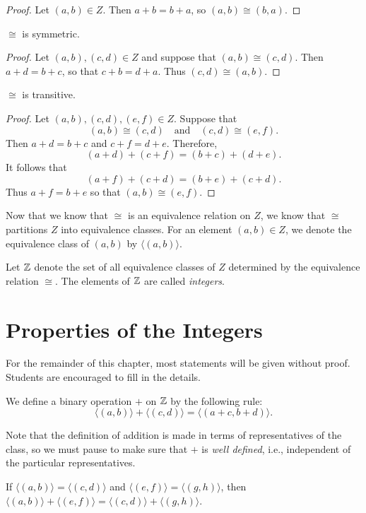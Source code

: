 \begin{proof}
Let $(a,b)\in Z$.  Then $a+b=b+a$, so $(a,b)\cong(b,a)$.
\end{proof}

\begin{lemma}
$\cong$ is symmetric.
\end{lemma}

\begin{proof} Let $(a,b),(c,d)\in Z$ and suppose
that $(a,b)\cong (c,d)$.  Then $a+d=b+c$, so that
$c+b=d+a$.  Thus $(c,d)\cong (a,b)$.
\end{proof}

\begin{lemma}
$\cong$ is transitive.
\end{lemma}

\begin{proof}
Let $(a,b), (c,d), (e,f)\in Z$.  Suppose that
\[
(a,b)\cong(c,d)\quad\text{and}\quad (c,d)\cong (e,f).
\]
Then $a+d=b+c$ and $c+f=d+e$.  Therefore,
\[
(a+d)+(c+f) =(b+c)+(d+e).
\]
It follows that
\[
(a+f)+(c+d) =(b+e)+(c+d).
\]
Thus $a+f = b+e$ so that $(a,b)\cong(e,f)$.
\end{proof}

Now that we know that $\cong$ is an equivalence relation on
$Z$, we know that $\cong$ partitions $Z$ into equivalence classes.
For an element $(a,b)\in Z$, we denote the equivalence class
of $(a,b)$ by $\langle (a,b)\rangle$.

Let $\mathbb{Z}$ denote the set of all equivalence classes of $Z$
determined by the equivalence relation $\cong$.  The elements
of $\mathbb{Z}$ are called \textit{integers}.

\section{Properties of the Integers}\label{s:background:prop-integers}

For the remainder of this chapter, most statements will be given
without proof.  Students are encouraged to fill in the
details.  

We define a binary operation $+$ on $\mathbb{Z}$ by the following rule:
\[
\langle(a,b)\rangle+\langle(c,d)\rangle = \langle(a+c,b+d)\rangle.  
\]

Note that the definition of addition is made in terms of 
representatives of the class, so we must pause to make sure
that $+$ is \textit{well defined}, i.e., independent of
the particular representatives.

\begin{lemma}
If $\langle(a,b)\rangle =\langle(c,d)\rangle$ and 
$\langle(e,f)\rangle=\langle(g,h)\rangle$, then
$\langle(a,b)\rangle+\langle(e,f)\rangle=
\langle(c,d)\rangle+\langle(g,h)\rangle$.
\end{lemma}

